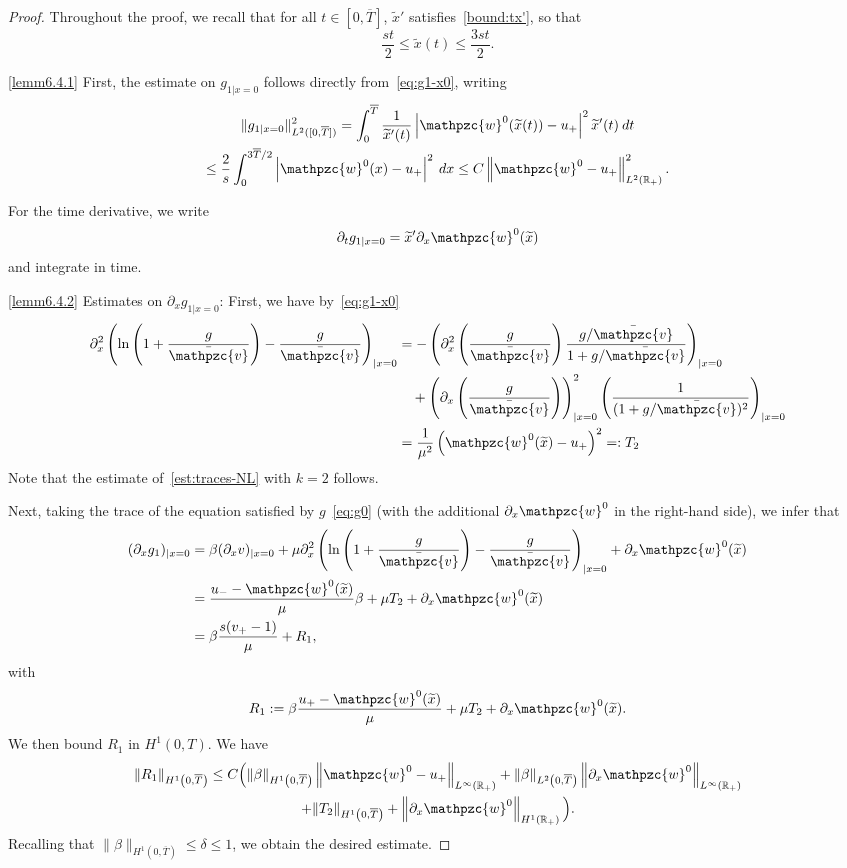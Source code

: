 \documentclass[AHL,Unicode,longabstracts,published]{cedram}
\newcommand{\R}{\mathbb{R}}
\newcommand{\p}{\partial}
\newcommand{\bv}{\bar{\mathpzc{v}}}
\newcommand{\tw}{\mathpzc{w}}
\newcommand{\tx}{\widetilde{x}}
\newcommand{\tx}{\widetilde{x}}
\begin{document}
\begin{proof}
Throughout the proof, we recall that for all $t\in [0, \overline{T}]$, $\tx'$ satisfies~\eqref{bound:tx'}, so that
\[
\frac{st}{2}\leq \tx(t)\leq \frac{3st}{2}.
\]

\noindent\eqref{lemm6.4.1} First, the estimate on $g_{1|x=0}$ follows directly from~\eqref{eq:g1-x0}, writing
\begin{multline*}
\|g_{1|x=0}\|_{L^2([0, \overline{T}])}^2=\int_0^{\overline{T}} \frac{1}{\tx'(t)}\left|\tw^0(\tx(t))-u_+\right|^2\tx'(t)\:dt\\
\leq \frac{2}{s}\int_0^{3 \overline{T}/2} \left|\tw^0(x)-u_+\right|^2 \:dx\leq C \left\|\tw^0-u_+\right\|_{L^2(\R_+)}^2.
\end{multline*}


For the time derivative, we write
\[
\partial_t g_{1|x=0}=\tx' \p_x \tw^0(\tx)
\]
and integrate in time.


\noindent\eqref{lemm6.4.2} Estimates on $\p_x g_{1|x=0}$: First, we have by~\eqref{eq:g1-x0}
\begin{equation}\label{eq:d2ln-x0}
\begin{split}
\partial^2_x \left(\ln \left(1+ \frac{g}{\bv}\right) -\frac{g}{\bv} \right)_{|x=0} & = - \left(\partial^2_x\left(\frac{g}{\bv}\right)\dfrac{g/\bv}{1+ g/\bv} \right)_{|x=0}\\
&\quad+ \left(\partial_x \left(\frac{g}{\bv}\right)\right)^2_{|x=0} \left(\dfrac{1}{(1+ g/\bv)^2}\right)_{|x=0}\\
& = \dfrac{1}{\mu^2} \left(\tw^0(\tx)-u_+\right)^2=:T_2
\end{split}
\end{equation}
Note that the estimate of~\eqref{est:traces-NL} with $k=2$ follows.


Next, taking the trace of the equation satisfied by $g$~\eqref{eq:g0} (with the additional $\partial_x \tw^0$ in the right-hand side), we infer that
\begin{align}\label{eq:dxg1-0}
(\partial_x g_1)_{|x=0} & = \beta (\partial_x v)_{|x=0} + \mu \partial^2_x \left(\ln \left(1+ \frac{g}{\bv}\right) -\frac{g}{\bv} \right)_{|x=0} + \partial_x \tw^0(\tx) \nonumber \\
& = \dfrac{u_- - \tw^0(\tx)}{\mu} \beta +\mu T_2+ \partial_x \tw^0(\tx)\\
& = \beta \dfrac{s(v_+ - 1)}{\mu} + R_1 \nonumber,
\end{align}
with
\[
R_1 := \beta \dfrac{u_+ - \tw^0(\tx)}{\mu} + \mu T_2 + \partial_x \tw^0(\tx).
\]
We then bound $R_1$ in $H^1(0,T)$. We have
\begin{multline*}
\|R_1\|_{H^1\left(0,\overline{T}\right)}  \leq C\Big(\|\beta\|_{H^1\left(0, \overline{T}\right)}\left\|\tw^0- u_+\right\|_{L^{\infty}(\R_+)} + \|\beta\|_{L^2\left(0, \overline{T}\right)} \left\|\p_x\tw^0\right\|_{L^\infty(\R_+)} \\
+ \|T_2\|_{H^1\left(0, \overline{T}\right)} + \left\|\p_x \tw^0\right\|_{H^1(\R_+)}\Big).
\end{multline*}
Recalling that $\|\beta\|_{H^1(0, \overline{T})}\leq \delta \leq 1$, we obtain the desired estimate.


\end{proof}
\end{document}
